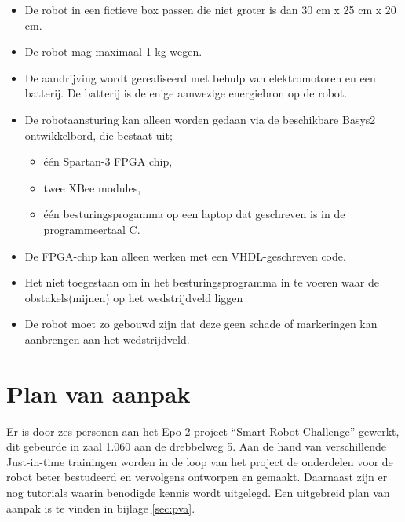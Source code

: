 \documentclass{report}
\begin{document}
\begin{itemize}

\item
De robot in een fictieve box passen die niet groter is dan 30 cm x 25 cm x 20 cm.

\item
De robot mag maximaal 1 kg wegen.

\item
De aandrijving wordt gerealiseerd met behulp van elektromotoren en een batterij.
De batterij is de enige aanwezige energiebron op de robot.

\item
De robotaansturing kan alleen worden gedaan via de beschikbare Basys2 ontwikkelbord, die bestaat uit;

\begin{itemize}

\item
één Spartan-3 FPGA chip,

\item
twee XBee modules,

\item
één besturingsprogamma op een laptop dat geschreven is in de programmeertaal C.


\end{itemize}

\item
De FPGA-chip kan alleen werken met een VHDL-geschreven code.

\item
Het niet toegestaan om in het besturingsprogramma in te voeren waar de obstakels(mijnen) op het wedstrijdveld liggen 

\item
De robot moet zo gebouwd zijn dat deze geen schade of markeringen kan aanbrengen aan het wedstrijdveld.

\end{itemize}

\section{Plan van aanpak}

Er is door zes personen aan het Epo-2 project “Smart Robot Challenge” gewerkt, dit gebeurde in zaal 1.060 aan de drebbelweg 5.
Aan de hand van verschillende Just-in-time trainingen worden in de loop van het project de onderdelen voor de robot beter bestudeerd en vervolgens ontworpen en gemaakt.
Daarnaast zijn er nog tutorials waarin benodigde kennis wordt uitgelegd.
Een uitgebreid plan van aanpak is te vinden in bijlage \ref{sec:pva}.
\end{document}
